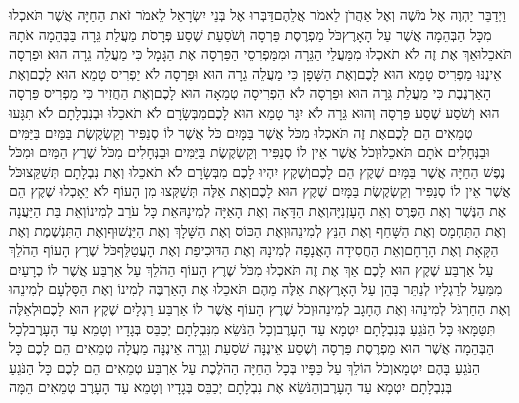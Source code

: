 \documentclass[../main/main.tex]{subfiles}
\begin{document}
\begin{multicols*}{\ncols}
וַיְדַבֵּר יַהְוֶה אֶל מֹשֶׁה וְאֶל אַהֲרֹן לֵאמֹר אֲלֵהֶם\PreVerseSpace{}דַּבְּרוּ אֶל בְּנֵי יִשְׂרָאֵל לֵאמֹר זֹאת הַחַיָּה אֲשֶׁר תֹּאכְלוּ מִכָּל הַבְּהֵמָה אֲשֶׁר עַל הָאָרֶץ\PreVerseSpace{}כֹּל מַפְרֶסֶת פַּרְסָה וְשֹׁסַעַת שֶׁסַע פְּרָסֹת מַעֲלַת גֵּרָה בַּבְּהֵמָה אֹתָהּ תֹּאכֵלוּ\PreVerseSpace{}אַךְ אֶת זֶה לֹא תֹאכְלוּ מִמַּעֲלֵי הַגֵּרָה וּמִמַּפְרִסֵי הַפַּרְסָה אֶת הַגָּמָל כִּי מַעֲלֵה גֵרָה הוּא וּפַרְסָה אֵינֶנּוּ מַפְרִיס טָמֵא הוּא לָכֶם\PreVerseSpace{}וְאֶת הַשָּׁפָן כִּי מַעֲלֵה גֵרָה הוּא וּפַרְסָה לֹא יַפְרִיס טָמֵא הוּא לָכֶם\PreVerseSpace{}וְאֶת הָאַרְנֶבֶת כִּי מַעֲלַת גֵּרָה הוּא וּפַרְסָה לֹא הִפְרִיסָה טְמֵאָה הוּא לָכֶם\PreVerseSpace{}וְאֶת הַחֲזִיר כִּי מַפְרִיס פַּרְסָה הוּא וְשֹׁסַע שֶׁסַע פַּרְסָה וְהוּא גֵּרָה לֹא יִגָּר טָמֵא הוּא לָכֶם\PreVerseSpace{}מִבְּשָׂרָם לֹא תֹאכֵלוּ וּבְנִבְלָתָם לֹא תִגָּעוּ טְמֵאִים הֵם לָכֶם\PreVerseSpace{}אֶת זֶה תֹּאכְלוּ מִכֹּל אֲשֶׁר בַּמָּיִם כֹּל אֲשֶׁר לוֹ סְנַפִּיר וְקַשְׂקֶשֶׂת בַּמַּיִם בַּיַּמִּים וּבַנְּחָלִים אֹתָם תֹּאכֵלוּ\PreVerseSpace{}וְכֹל אֲשֶׁר אֵין לוֹ סְנַפִּיר וְקַשְׂקֶשֶׂת בַּיַּמִּים וּבַנְּחָלִים מִכֹּל שֶׁרֶץ הַמַּיִם וּמִכֹּל נֶפֶשׁ הַחַיָּה אֲשֶׁר בַּמָּיִם שֶׁקֶץ הֵם לָכֶם\PreVerseSpace{}וְשֶׁקֶץ יִהְיוּ לָכֶם מִבְּשָׂרָם לֹא תֹאכֵלוּ וְאֶת נִבְלָתָם תְּשַׁקֵּצוּ\PreVerseSpace{}כֹּל אֲשֶׁר אֵין לוֹ סְנַפִּיר וְקַשְׂקֶשֶׂת בַּמָּיִם שֶׁקֶץ הוּא לָכֶם\PreVerseSpace{}וְאֶת אֵלֶּה תְּשַׁקְּצוּ מִן הָעוֹף לֹא יֵאָכְלוּ שֶׁקֶץ הֵם אֶת הַנֶּשֶׁר וְאֶת הַפֶּרֶס וְאֵת הָעָזְנִיָּה\PreVerseSpace{}וְאֶת הַדָּאָה וְאֶת הָאַיָּה לְמִינָהּ\PreVerseSpace{}אֵת כָּל עֹרֵב לְמִינוֹ\PreVerseSpace{}וְאֵת בַּת הַיַּעֲנָה וְאֶת הַתַּחְמָס וְאֶת הַשָּׁחַף וְאֶת הַנֵּץ לְמִינֵהוּ\PreVerseSpace{}וְאֶת הַכּוֹס וְאֶת הַשָּׁלָךְ וְאֶת הַיַּנְשׁוּף\PreVerseSpace{}וְאֶת הַתִּנְשֶׁמֶת וְאֶת הַקָּאָת וְאֶת הָרָחָם\PreVerseSpace{}וְאֵת הַחֲסִידָה הָאֲנָפָה לְמִינָהּ וְאֶת הַדּוּכִיפַת וְאֶת הָעֲטַלֵּף\PreVerseSpace{}כֹּל שֶׁרֶץ הָעוֹף הַהֹלֵךְ עַל אַרְבַּע שֶׁקֶץ הוּא לָכֶם \ClosedSection{}אַךְ אֶת זֶה תֹּאכְלוּ מִכֹּל שֶׁרֶץ הָעוֹף הַהֹלֵךְ עַל אַרְבַּע אֲשֶׁר לוֹ\SubEnd{} כְרָעַיִם מִמַּעַל לְרַגְלָיו לְנַתֵּר בָּהֵן עַל הָאָרֶץ\PreVerseSpace{}אֶת אֵלֶּה מֵהֶם תֹּאכֵלוּ אֶת הָאַרְבֶּה לְמִינוֹ וְאֶת הַסָּלְעָם לְמִינֵהוּ וְאֶת הַחַרְגֹּל לְמִינֵהוּ וְאֶת הֶחָגָב לְמִינֵהוּ\PreVerseSpace{}וְכֹל שֶׁרֶץ הָעוֹף אֲשֶׁר לוֹ אַרְבַּע רַגְלָיִם שֶׁקֶץ הוּא לָכֶם\PreVerseSpace{}וּלְאֵלֶּה תִּטַּמָּאוּ כָּל הַנֹּגֵעַ בְּנִבְלָתָם יִטְמָא עַד הָעָרֶב\PreVerseSpace{}וְכָל הַנֹּשֵׂא מִנִּבְלָתָם יְכַבֵּס בְּגָדָיו וְטָמֵא עַד הָעָרֶב\PreVerseSpace{}לְכָל הַבְּהֵמָה אֲשֶׁר הוּא מַפְרֶסֶת פַּרְסָה וְשֶׁסַע אֵינֶנָּה שֹׁסַעַת וְגֵרָה אֵינֶנָּה מַעֲלָה טְמֵאִים הֵם לָכֶם כָּל הַנֹּגֵעַ בָּהֶם יִטְמָא\PreVerseSpace{}וְכֹל הוֹלֵךְ עַל כַּפָּיו בְּכָל הַחַיָּה הַהֹלֶכֶת עַל אַרְבַּע טְמֵאִים הֵם לָכֶם כָּל הַנֹּגֵעַ בְּנִבְלָתָם יִטְמָא עַד הָעָרֶב\PreVerseSpace{}וְהַנֹּשֵׂא אֶת נִבְלָתָם יְכַבֵּס בְּגָדָיו וְטָמֵא עַד הָעָרֶב טְמֵאִים הֵמָּה 
\end{multicols*}
\end{document}

